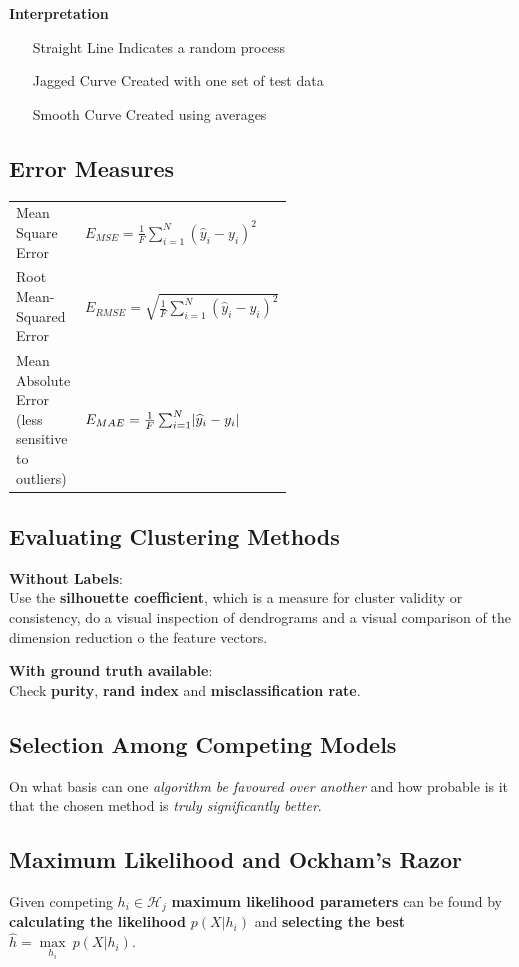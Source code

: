 \documentclass[11pt]{article}
\theoremstyle{definition}
\newcommand*\Hilbert{\ensuremath{\mathcal{H}}}
\DeclarePairedDelimiter\abs{\lvert}{\rvert}
\begin{document}
\noindent
\textbf{Interpretation}
\begin{itemize}[leftmargin=*, labelindent=3cm, labelsep=1cm]
	\item[Straight Line] Indicates a random process
	\item[Jagged Curve] Created with one set of test data
	\item[Smooth Curve] Created using averages
\end{itemize}

\subsection{Error Measures}
\vspace{-1.5em}
\begingroup
	\renewcommand{\arraystretch}{2}
	\begin{tabularx}{\linewidth}{p{0.55\linewidth}X}
		Mean Square Error & $ E_{MSE} = \frac{1}{F}\sum_{i=1}^{N} (\widehat{y}_i - y_i)^2 $\\
		Root Mean-Squared Error & $E_{RMSE} = \sqrt{\frac{1}{F}\sum_{i=1}^{N} (\widehat{y}_i - y_i)^2 } $\\
		Mean Absolute Error (less sensitive to outliers) & $ E_{MAE} = \frac{1}{F}\sum_{i=1}^{N} \abs{\widehat{y}_i - y_i}$
	\end{tabularx}
\endgroup

\subsection{Evaluating Clustering Methods}
\textbf{Without Labels}:\\
Use the \textbf{silhouette coefficient}, which is a measure for cluster validity or consistency, do a visual inspection of dendrograms and a visual comparison of the dimension reduction o the feature vectors.

\vspace{1em}
\noindent
\textbf{With ground truth available}:\\
Check \textbf{purity}, \textbf{rand index} and \textbf{misclassification rate}.

\subsection{Selection Among Competing Models}
On what basis can one \emph{algorithm be favoured over another} and how probable is it that the chosen method is \emph{truly significantly better}.

\subsection{Maximum Likelihood and Ockham's Razor}
Given competing $h_i \in \Hilbert_j$ \textbf{maximum likelihood parameters} can be found by \textbf{calculating the likelihood} $p(X|h_i)$ and \textbf{selecting the best} $\hat{h} = \underset{h_i}{\max}\ p(X|h_i)$.
\end{document}
